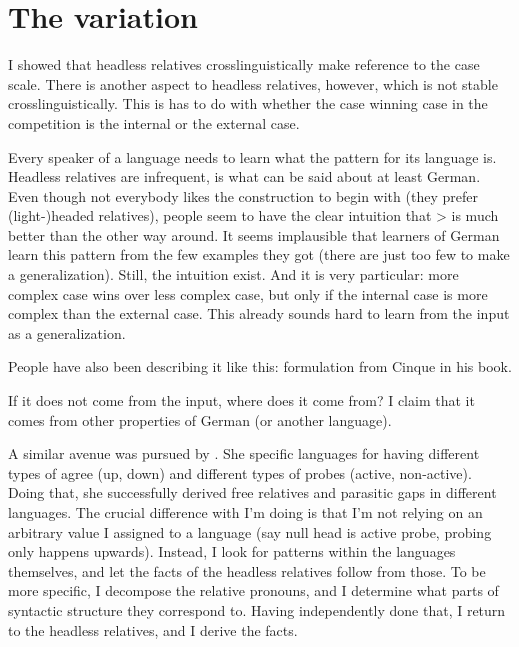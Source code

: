 
\chapter{The variation}

I showed that headless relatives crosslinguistically make reference to the case scale. There is another aspect to headless relatives, however, which is not stable crosslinguistically. This is has to do with whether the case winning case in the competition is the internal or the external case.


Every speaker of a language needs to learn what the pattern for its language is. Headless relatives are infrequent, is what can be said about at least German. Even though not everybody likes the construction to begin with (they prefer (light-)headed relatives), people seem to have the clear intuition that > is much better than the other way around. It seems implausible that learners of German learn this pattern from the few examples they got (there are just too few to make a generalization). Still, the intuition exist. And it is very particular: more complex case wins over less complex case, but only if the internal case is more complex than the external case. This already sounds hard to learn from the input as a generalization.

People have also been describing it like this: formulation from Cinque in his book.

If it does not come from the input, where does it come from? I claim that it comes from other properties of German (or another language).

A similar avenue was pursued by \citealt{himmelreich2017}. She specific languages for having different types of agree (up, down) and different types of probes (active, non-active). Doing that, she successfully derived free relatives and parasitic gaps in different languages.
The crucial difference with I'm doing is that I'm not relying on an arbitrary value I assigned to a language (say null head is active probe, probing only happens upwards). Instead, I look for patterns within the languages themselves, and let the facts of the headless relatives follow from those. To be more specific, I decompose the relative pronouns, and I determine what parts of syntactic structure they correspond to. Having independently done that, I return to the headless relatives, and I derive the facts.



